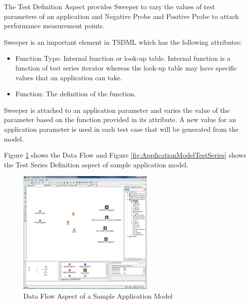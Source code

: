 The Test Definition Aspect provides Sweeper to vary the values of test parameters of an application and Negative Probe and Positive Probe to attach performance measurement points.

Sweeper is an important element in TSDML which has the following attributes:

\begin{itemize}
	\item Function Type: Internal function or look-up table. Internal function is a function of test series iterator whereas the look-up table may have specific values that an application can take.
	\item Function: The definition of the function.
\end{itemize}

Sweeper is attached to an application parameter and varies the value of the parameter based on the function provided in its attribute. A new value for an application parameter is used in each test case that will be generated from the model.

Figure \ref{fig:ApplicationModelDataFlow} shows the Data Flow and Figure \ref{fig:ApplicationModelTestSeries} shows the Test Series Definition aspect of sample application model.

\begin{figure}
	\centering
		\includegraphics[width=0.60\textwidth]{figures/ApplicationModelDataFlow.png}
	\caption{Data Flow Aspect of a Sample Application Model}
	\label{fig:ApplicationModelDataFlow}
\end{figure}

